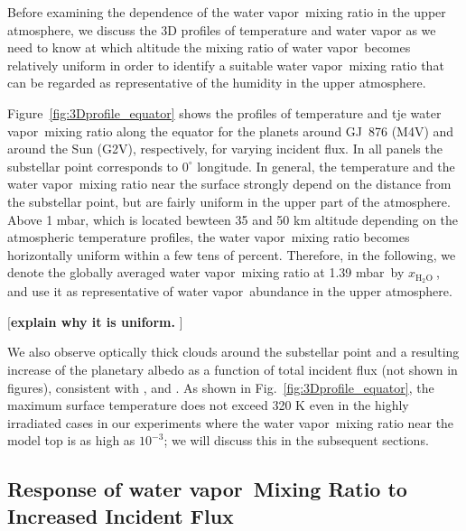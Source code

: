 \documentclass[11pt,numberedappendix,twocolappendix,]{emulateapj}
\def\water{H$_2$O }
\def\xwater{$x_\text{\water}$}
\def\preslevel{1.39 mbar\ }
\def\memo#1{\color{red}$[${\bf #1}$]$ \color{black}}
\newcommand{\wv}{{\color{orange}water vapor\ }}
\begin{document}
Before examining the dependence of the \wv mixing ratio in the upper atmosphere, we discuss the 3D profiles of temperature and water vapor as we need to know at which altitude the mixing ratio of \wv becomes relatively uniform in order to identify a suitable \wv mixing ratio that can be regarded as representative of the humidity in the upper atmosphere. 

Figure~\ref{fig:3Dprofile_equator} shows the profiles of temperature and tje \wv mixing ratio along the equator for the planets around GJ~876 (M4V) and around the Sun (G2V), respectively, for varying incident flux. 
In all panels the substellar point corresponds to $0^{\circ }$ longitude. 
In general, the temperature and the \wv mixing ratio near the surface strongly depend on the distance from the substellar point, but are fairly uniform in the upper part of the atmosphere. 
Above 1 mbar, which is located bewteen 35 and 50 km altitude depending on the atmospheric temperature profiles, the \wv mixing ratio becomes horizontally uniform within a few tens of percent. 
Therefore, in the following, we denote the globally averaged \wv mixing ratio at \preslevel by \xwater, and use it as representative of \wv abundance in the upper atmosphere. 

\memo{explain why it is uniform. }

We also observe optically thick clouds around the substellar point and a resulting increase of the planetary albedo as a function of total incident flux (not shown in figures), consistent with \citet{Yang2013,Yang2014}, \citet{Kopparapu2016} and \citet{Way2016}. 
As shown in Fig.~\ref{fig:3Dprofile_equator}, the maximum surface temperature does not exceed 320 K even in the highly irradiated cases in our experiments where the \wv mixing ratio near the model top is as high as $10^{-3}$; we will discuss this in the subsequent sections. 


\subsection{Response of \wv Mixing Ratio to Increased Incident Flux}
\label{ss:result_H2Omixingratio}
\end{document}
